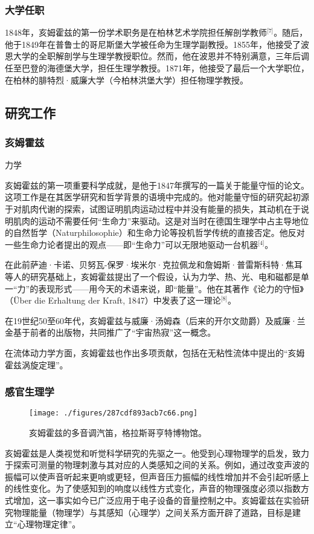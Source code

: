 \subsubsection{大学任职}
1848年，亥姆霍兹的第一份学术职务是在柏林艺术学院担任解剖学教师\(^\text{[7]}\)。随后，他于1849年在普鲁士的哥尼斯堡大学被任命为生理学副教授。1855年，他接受了波恩大学的全职解剖学与生理学教授职位。然而，他在波恩并不特别满意，三年后调任至巴登的海德堡大学，担任生理学教授。1871年，他接受了最后一个大学职位，在柏林的腓特烈·威廉大学（今柏林洪堡大学）担任物理学教授。
\subsection{研究工作}
\subsubsection{亥姆霍兹}
力学

亥姆霍兹的第一项重要科学成就，是他于1847年撰写的一篇关于能量守恒的论文。这项工作是在其医学研究和哲学背景的语境中完成的。他对能量守恒的研究起初源于对肌肉代谢的探索，试图证明肌肉运动过程中并没有能量的损失，其动机在于说明肌肉的运动不需要任何“生命力”来驱动。这是对当时在德国生理学中占主导地位的自然哲学（Naturphilosophie）和生命力论等投机哲学传统的直接否定。他反对一些生命力论者提出的观点——即“生命力”可以无限地驱动一台机器\(^\text{[4]}\)。

在此前萨迪·卡诺、贝努瓦-保罗·埃米尔·克拉佩龙和詹姆斯·普雷斯科特·焦耳等人的研究基础上，亥姆霍兹提出了一个假设，认为力学、热、光、电和磁都是单一“力”的表现形式——用今天的术语来说，即“能量”。他在其著作《论力的守恒》（Über die Erhaltung der Kraft, 1847）中发表了这一理论\(^\text{[8]}\)。

在19世纪50至60年代，亥姆霍兹与威廉·汤姆森（后来的开尔文勋爵）及威廉·兰金基于前者的出版物，共同推广了“宇宙热寂”这一概念。

在流体动力学方面，亥姆霍兹也作出多项贡献，包括在无粘性流体中提出的“亥姆霍兹涡旋定理”。
\subsubsection{感官生理学}
\begin{figure}[ht]
\centering
\texttt{[image: ./figures/287cdf893acb7c66.png]}
\caption{亥姆霍兹的多音调汽笛，格拉斯哥亨特博物馆。} \label{fig_HEMfhm_1}
\end{figure}
亥姆霍兹是人类视觉和听觉科学研究的先驱之一。他受到心理物理学的启发，致力于探索可测量的物理刺激与其对应的人类感知之间的关系。例如，通过改变声波的振幅可以使声音听起来更响或更轻，但声音压力振幅的线性增加并不会引起听感上的线性变化。为了使感知到的响度以线性方式变化，声音的物理强度必须以指数方式增加，这一事实如今已广泛应用于电子设备的音量控制之中。亥姆霍兹在实验研究物理能量（物理学）与其感知（心理学）之间关系方面开辟了道路，目标是建立“心理物理定律”。

